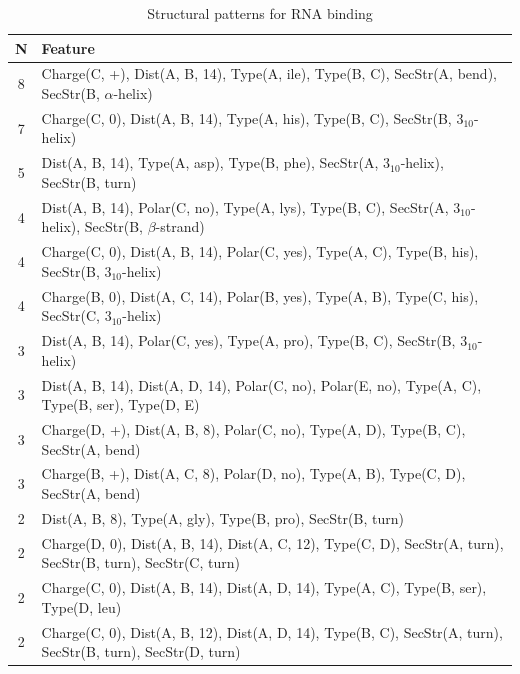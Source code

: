 \documentclass[11pt,twoside,a4paper]{book}
\begin{document}
\begin{table}\begin{tabularx}{\textwidth}{cX}\textbf{N} & \textbf{Feature} \\ \hline  
8 & Charge(C, +), Dist(A, B, 14),  Type(A, ile), Type(B, C), SecStr(A, bend), \newline SecStr(B, $\alpha$-helix)\\ \hline 
7 & Charge(C, 0), Dist(A, B, 14),  Type(A, his), Type(B, C), SecStr(B, $3_{10}$-helix)\\ \hline 
5 & Dist(A, B, 14),  Type(A, asp), Type(B, phe), SecStr(A, $3_{10}$-helix), SecStr(B, turn)\\ \hline 
4 & Dist(A, B, 14), Polar(C, no),  Type(A, lys), Type(B, C), SecStr(A, $3_{10}$-helix), \newline SecStr(B, $\beta$-strand)\\ \hline 
4 & Charge(C, 0), Dist(A, B, 14), Polar(C, yes),  Type(A, C), Type(B, his), \newline SecStr(B, $3_{10}$-helix)\\ \hline 
4 & Charge(B, 0), Dist(A, C, 14), Polar(B, yes),  Type(A, B), Type(C, his), \newline SecStr(C, $3_{10}$-helix)\\ \hline 
3 & Dist(A, B, 14), Polar(C, yes),  Type(A, pro), Type(B, C), SecStr(B, $3_{10}$-helix)\\ \hline 
3 & Dist(A, B, 14), Dist(A, D, 14), Polar(C, no), Polar(E, no),  Type(A, C), Type(B, ser), Type(D, E)\\ \hline 
3 & Charge(D, +), Dist(A, B, 8), Polar(C, no),  Type(A, D), Type(B, C), SecStr(A, bend)\\ \hline 
3 & Charge(B, +), Dist(A, C, 8), Polar(D, no),  Type(A, B), Type(C, D), SecStr(A, bend)\\ \hline 
2 & Dist(A, B, 8),  Type(A, gly), Type(B, pro), SecStr(B, turn)\\ \hline 
2 & Charge(D, 0), Dist(A, B, 14), Dist(A, C, 12),  Type(C, D), SecStr(A, turn), \newline SecStr(B, turn), SecStr(C, turn)\\ \hline 
2 & Charge(C, 0), Dist(A, B, 14), Dist(A, D, 14),  Type(A, C), Type(B, ser), \newline Type(D, leu)\\ \hline 
2 & Charge(C, 0), Dist(A, B, 12), Dist(A, D, 14),  Type(B, C), SecStr(A, turn), \newline SecStr(B, turn), SecStr(D, turn)\\ \hline 
 \end{tabularx}\caption{Structural patterns for RNA binding}\label{tab:RNA_binding}\end{table}
\end{document}
